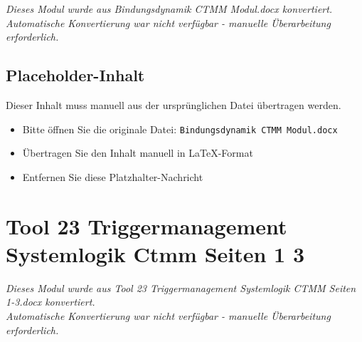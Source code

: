 \begin{center}
\textit{Dieses Modul wurde aus Bindungsdynamik CTMM Modul.docx konvertiert.\\
Automatische Konvertierung war nicht verfügbar - manuelle Überarbeitung erforderlich.}
\end{center}


\subsection{Placeholder-Inhalt}

Dieser Inhalt muss manuell aus der ursprünglichen Datei übertragen werden.

\begin{itemize}
\item Bitte öffnen Sie die originale Datei: \texttt{Bindungsdynamik CTMM Modul.docx}
\item Übertragen Sie den Inhalt manuell in LaTeX-Format
\item Entfernen Sie diese Platzhalter-Nachricht
\end{itemize}




\section{Tool 23 Triggermanagement Systemlogik Ctmm Seiten 1 3}
\label{sec:tool-23-triggermanagement-systemlogik-ctmm-seiten-1-3}

\begin{center}
\textit{Dieses Modul wurde aus Tool 23 Triggermanagement Systemlogik CTMM Seiten 1-3.docx konvertiert.\\
Automatische Konvertierung war nicht verfügbar - manuelle Überarbeitung erforderlich.}
\end{center}


